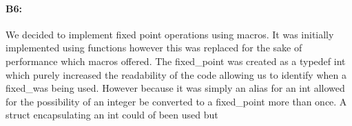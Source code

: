 \paragraph{B6:} %
We decided to implement fixed point operations using macros. It was initially implemented using functions however this was replaced for the sake of performance which macros offered.
The fixed\_point was created as a typedef int which purely increased the readability of the code allowing us to identify when a fixed_\point was being used. However because it was simply an alias for an int allowed for the possibility of an integer be converted to a fixed\_point more than once.
A struct encapsulating an int could of been used but 